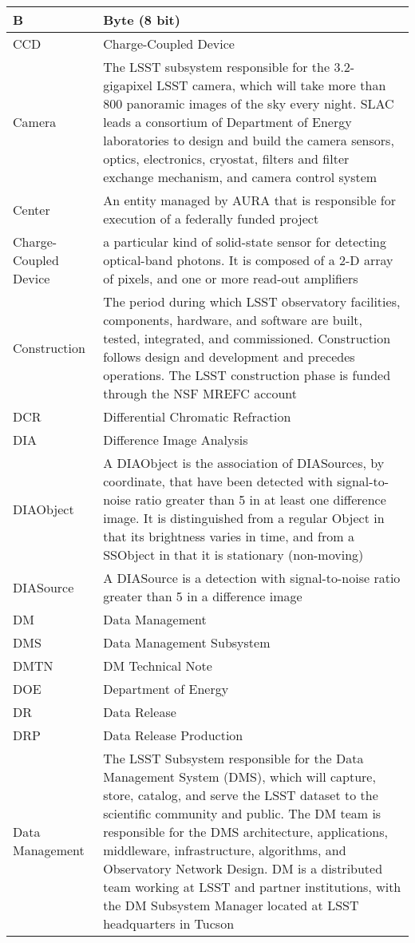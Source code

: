 \begin{longtable}{|p{}|p{}|}
B & Byte (8 bit) \\\hline
CCD & \gls{Charge-Coupled Device} \\\hline
Camera & The \gls{LSST} subsystem responsible for the 3.2-gigapixel \gls{LSST} \gls{camera}, which will take more than 800 panoramic images of the sky every night. \gls{SLAC} leads a consortium of \gls{Department of Energy} laboratories to design and build the \gls{camera} sensors, optics, electronics, cryostat, filters and filter exchange mechanism, and \gls{camera} control system \\\hline
Center & An entity managed by \gls{AURA} that is responsible for execution of a federally funded project \\\hline
Charge-Coupled Device & a particular kind of solid-state sensor for detecting optical-band photons. It is composed of a 2-D array of pixels, and one or more read-out amplifiers \\\hline
Construction & The period during which \gls{LSST} observatory facilities, components, hardware, and software are built, tested, integrated, and commissioned. \gls{Construction} follows design and development and precedes operations. The \gls{LSST} construction phase is funded through the \gls{NSF} \gls{MREFC} account \\\hline
DCR & \gls{Differential Chromatic Refraction} \\\hline
DIA & \gls{Difference Image} Analysis \\\hline
DIAObject & A \gls{DIAObject} is the association of DIASources, by coordinate, that have been detected with signal-to-noise ratio greater than 5 in at least one difference image. It is distinguished from a regular \gls{Object} in that its brightness varies in time, and from a SSObject in that it is stationary (non-moving) \\\hline
DIASource & A \gls{DIASource} is a detection with signal-to-noise ratio greater than 5 in a difference image \\\hline
DM & \gls{Data Management} \\\hline
DMS & \gls{Data Management} \gls{Subsystem} \\\hline
DMTN & \gls{DM} Technical Note \\\hline
DOE & \gls{Department of Energy} \\\hline
DR & \gls{Data Release} \\\hline
DRP & \gls{Data Release Production} \\\hline
Data Management & The \gls{LSST} Subsystem responsible for the \gls{Data Management} System (\gls{DMS}), which will capture, store, catalog, and serve the \gls{LSST} dataset to the scientific community and public. The \gls{DM} team is responsible for the \gls{DMS} architecture, applications, middleware, infrastructure, algorithms, and Observatory Network Design. \gls{DM} is a distributed team working at \gls{LSST} and partner institutions, with the \gls{DM} \gls{Subsystem Manager} located at \gls{LSST} headquarters in Tucson \\\hline

\end{longtable}
